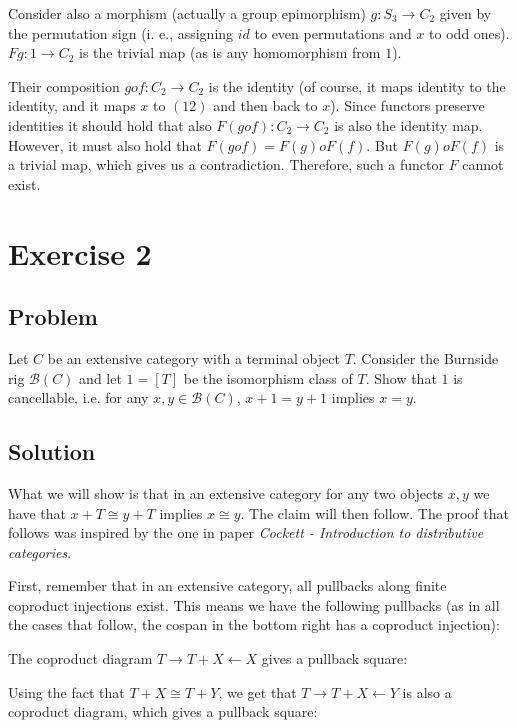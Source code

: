 \documentclass{article}
\begin{document}
Consider also a morphism (actually a group epimorphism) $g: S_3 \to C_2$ given by the permutation sign (i. e., assigning $id$ to even permutations and $x$ to odd ones). $Fg: 1 \to C_2$ is the trivial map (as is any homomorphism from $1$).

Their composition $g o f : C_2 \to C_2$ is the identity (of course, it maps identity to the identity, and it maps $x$ to $(12)$ and then back to $x$). Since functors preserve identities it should hold that also $F(g o f) : C_2 \to C_2$ is also the identity map. However, it must also hold that $F(g o f) = F(g) o F(f)$. But $F(g) o F(f)$ is a trivial map, which gives us a contradiction. Therefore, such a functor $F$ cannot exist.
\newpage
\section*{Exercise 2}
\subsection*{Problem}
Let $C$ be an extensive category with a terminal object $T$. Consider the Burnside rig $\mathcal{B}(C)$ and let $1 = [T]$ be the isomorphism class of $T$. Show that $1$ is cancellable, i.e. for any $x,y \in \mathcal{B}(C)$, $x+1=y+1$ implies $x=y$.
\subsection*{Solution}
What we will show is that in an extensive category for any two objects $x,y$ we have that $x+T \cong y+T$ implies $x \cong y$. The claim will then follow.
The proof that follows was inspired by the one in paper \textit{Cockett - Introduction to distributive categories}.

First, remember that in an extensive category, all pullbacks along finite coproduct injections exist. This means we have the following pullbacks (as in all the cases that follow, the cospan in the bottom right has a coproduct injection):

The coproduct diagram $T \rightarrow T+X \leftarrow X$ gives a pullback square:

\begin{center}\end{center}

Using the fact that $T+X \cong T+Y$, we get that $T \rightarrow T+X \leftarrow Y$ is also a coproduct diagram, which gives a pullback square:
\end{document}
